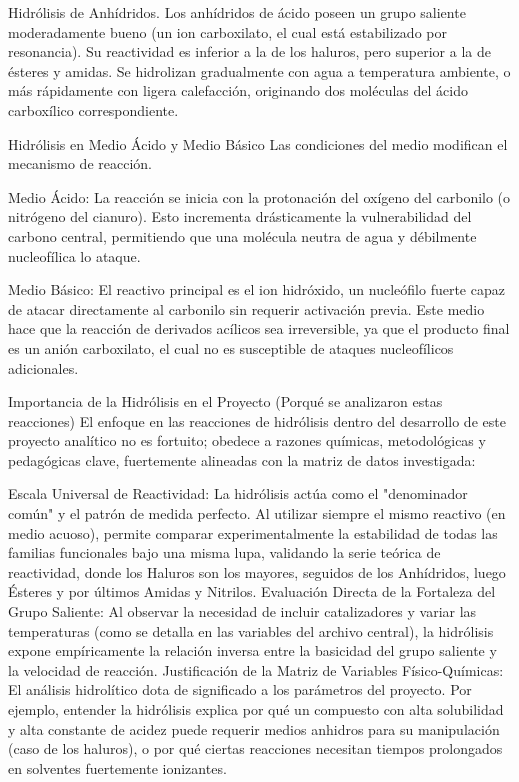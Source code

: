 \documentclass{article}
\begin{document}
Hidrólisis de Anhídridos.
Los anhídridos de ácido poseen un grupo saliente moderadamente bueno (un ion carboxilato, el cual está estabilizado por resonancia). Su reactividad es inferior a la de los haluros, pero superior a la de ésteres y amidas. Se hidrolizan gradualmente con agua a temperatura ambiente, o más rápidamente con ligera calefacción, originando dos moléculas del ácido carboxílico correspondiente.

Hidrólisis en Medio Ácido y Medio Básico
Las condiciones del medio modifican el mecanismo de reacción.

Medio Ácido: La reacción se inicia con la protonación del oxígeno del carbonilo (o nitrógeno del cianuro). Esto incrementa drásticamente la vulnerabilidad del carbono central, permitiendo que una molécula neutra de agua y débilmente nucleofílica lo ataque.

Medio Básico: El reactivo principal es el ion hidróxido, un nucleófilo fuerte capaz de atacar directamente al carbonilo sin requerir activación previa. Este medio hace que la reacción de derivados acílicos sea irreversible, ya que el producto final es un anión carboxilato, el cual no es susceptible de ataques nucleofílicos adicionales.

Importancia de la Hidrólisis en el Proyecto (Porqué se analizaron estas reacciones)
El enfoque en las reacciones de hidrólisis dentro del desarrollo de este proyecto analítico no es fortuito; obedece a razones químicas, metodológicas y pedagógicas clave, fuertemente alineadas con la matriz de datos investigada:

Escala Universal de Reactividad: La hidrólisis actúa como el "denominador común" y el patrón de medida perfecto. Al utilizar siempre el mismo reactivo (en medio acuoso), permite comparar experimentalmente la estabilidad de todas las familias funcionales bajo una misma lupa, validando la serie teórica de reactividad, donde los Haluros son los mayores, seguidos de los Anhídridos, luego Ésteres y por últimos Amidas y Nitrilos.
Evaluación Directa de la Fortaleza del Grupo Saliente: Al observar la necesidad de incluir catalizadores y variar las temperaturas (como se detalla en las variables del archivo central), la hidrólisis expone empíricamente la relación inversa entre la basicidad del grupo saliente y la velocidad de reacción.
Justificación de la Matriz de Variables Físico-Químicas: El análisis hidrolítico dota de significado a los parámetros del proyecto. Por ejemplo, entender la hidrólisis explica por qué un compuesto con alta solubilidad y alta constante de acidez puede requerir medios anhidros para su manipulación (caso de los haluros), o por qué ciertas reacciones necesitan tiempos prolongados en solventes fuertemente ionizantes.
\end{document}
